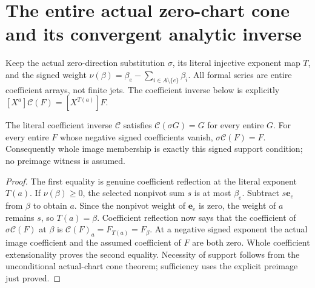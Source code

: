 \section{The entire actual zero-chart cone and its convergent analytic inverse}

Keep the actual zero-direction substitution $\sigma$, its literal injective
exponent map $T$, and the signed weight $\nu(\beta)=\beta_e-\sum_{i\in A\setminus\{e\}}\beta_i$.
All formal series are entire coefficient arrays, not finite jets. The coefficient
inverse below is explicitly $[X^a]\mathcal C(F)=[X^{T(a)}]F$.

\begin{theorem}
\label{hir:actual-zero-chart-whole-cone-range}
\leanok
The literal coefficient inverse $\mathcal C$ satisfies $\mathcal C(\sigma G)=G$
for every entire $G$. For every entire $F$ whose negative signed coefficients
vanish, $\sigma\mathcal C(F)=F$. Consequently whole image membership is
exactly this signed support condition; no preimage witness is assumed.
\end{theorem}
\begin{proof}
The first equality is genuine coefficient reflection at the literal exponent
$T(a)$. If $\nu(\beta)\ge0$, the selected nonpivot sum $s$ is at most
$\beta_e$. Subtract $s\mathbf e_e$ from $\beta$ to obtain $a$. Since the
nonpivot weight of $\mathbf e_e$ is zero, the weight of $a$ remains $s$,
so $T(a)=\beta$. Coefficient reflection now says that the coefficient of
$\sigma\mathcal C(F)$ at $\beta$ is $\mathcal C(F)_a=F_{T(a)}=F_\beta$.
At a negative signed exponent the actual image coefficient and the assumed
coefficient of $F$ are both zero. Whole coefficient extensionality proves
the second equality. Necessity of support follows from the unconditional
actual-chart cone theorem; sufficiency uses the explicit preimage just proved.
\end{proof}

